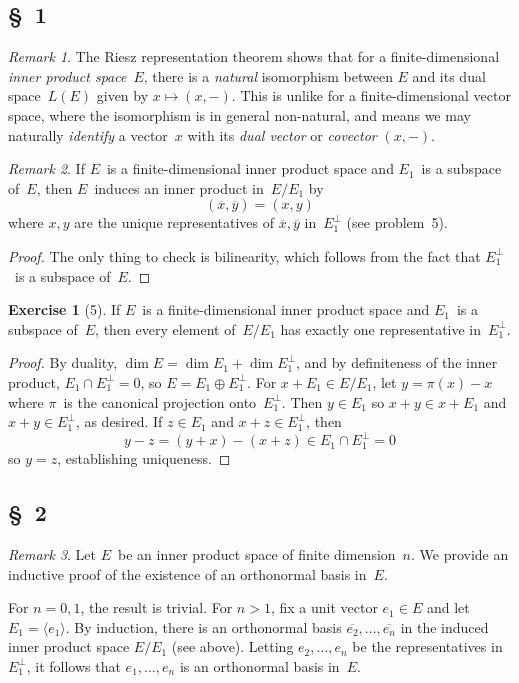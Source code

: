 \documentclass[letterpaper,12pt]{article}
\newcommand{\sect}{\cap}
\newcommand{\dsum}{\oplus}
\newcommand{\gen}[1]{\langle#1\rangle}
\newcommand{\oc}[1]{#1^{\perp}}
\newcommand{\iprod}[2]{(#1,#2)}
\newcommand{\proj}[1]{\overline{#1}}
\theoremstyle{definition}
\newtheorem*{exer}{Exercise}
\theoremstyle{remark}
\newtheorem*{rmk}{Remark}
\begin{document}
\subsection*{\S~1}
\begin{rmk}
The Riesz representation theorem shows that for a finite-dimensional \emph{inner product space}~\(E\), there is a \emph{natural} isomorphism between \(E\) and its dual space~\(L(E)\) given by \(x\mapsto\iprod{x}{-}\). This is unlike for a finite-dimensional vector space, where the isomorphism is in general non-natural, and means we may naturally \emph{identify} a vector~\(x\) with its \emph{dual vector} or \emph{covector} \(\iprod{x}{-}\).
\end{rmk}

\begin{rmk}
If \(E\)~is a finite-dimensional inner product space and \(E_1\)~is a subspace of~\(E\), then \(E\)~induces an inner product in~\(E/E_1\) by
\[\iprod{\proj{x}}{\proj{y}}=\iprod{x}{y}\]
where \(x,y\) are the unique representatives of \(\proj{x},\proj{y}\) in~\(\oc{E_1}\) (see problem~5).
\end{rmk}
\begin{proof}
The only thing to check is bilinearity, which follows from the fact that \(\oc{E_1}\)~is a subspace of~\(E\).
\end{proof}

\begin{exer}[5]
If \(E\)~is a finite-dimensional inner product space and \(E_1\)~is a subspace of~\(E\), then every element of~\(E/E_1\) has exactly one representative in~\(\oc{E_1}\).
\end{exer}
\begin{proof}
By duality, \(\dim E=\dim E_1+\dim\oc{E_1}\), and by definiteness of the inner product, \(E_1\sect\oc{E_1}=0\), so \(E=E_1\dsum\oc{E_1}\). For \(x+E_1\in E/E_1\), let \(y=\pi(x)-x\) where \(\pi\)~is the canonical projection onto~\(\oc{E_1}\). Then \(y\in E_1\) so \(x+y\in x+E_1\) and \(x+y\in\oc{E_1}\), as desired. If \(z\in E_1\) and \(x+z\in\oc{E_1}\), then
\[y-z=(y+x)-(x+z)\in E_1\sect\oc{E_1}=0\]
so \(y=z\), establishing uniqueness.
\end{proof}

\subsection*{\S~2}
\begin{rmk}
Let \(E\)~be an inner product space of finite dimension~\(n\). We provide an inductive proof of the existence of an orthonormal basis in~\(E\).

For \(n=0,1\), the result is trivial. For \(n>1\), fix a unit vector \(e_1\in E\) and let \(E_1=\gen{e_1}\). By induction, there is an orthonormal basis \(\proj{e_2},\ldots,\proj{e_n}\) in the induced inner product space \(E/E_1\) (see above). Letting \(e_2,\ldots,e_n\) be the representatives in~\(\oc{E_1}\), it follows that \(e_1,\ldots,e_n\) is an orthonormal basis in~\(E\).
\end{rmk}
\end{document}
